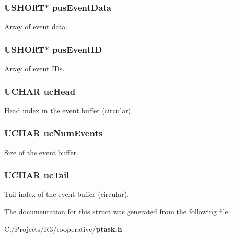 \subsubsection[{pusEventData}]{\setlength{\rightskip}{0pt plus 5cm}USHORT$\ast$ {\bf pusEventData}}\label{struct_p_t_a_s_k___e_v_e_n_t___s_t_r_u_c_t_a2dfcbf484220e9605cfba8d13114604e}


Array of event data. 
\subsubsection[{pusEventID}]{\setlength{\rightskip}{0pt plus 5cm}USHORT$\ast$ {\bf pusEventID}}\label{struct_p_t_a_s_k___e_v_e_n_t___s_t_r_u_c_t_ac01e1de90129401d0a7b2434e2b3e42f}


Array of event IDs. 
\subsubsection[{ucHead}]{\setlength{\rightskip}{0pt plus 5cm}UCHAR {\bf ucHead}}\label{struct_p_t_a_s_k___e_v_e_n_t___s_t_r_u_c_t_a4f91c0e37cafa6eaac87a3bc1b422dfc}


Head index in the event buffer (circular). 
\subsubsection[{ucNumEvents}]{\setlength{\rightskip}{0pt plus 5cm}UCHAR {\bf ucNumEvents}}\label{struct_p_t_a_s_k___e_v_e_n_t___s_t_r_u_c_t_ace9d2744b5bfe6fd35c7c0090542f9d7}


Size of the event buffer. 
\subsubsection[{ucTail}]{\setlength{\rightskip}{0pt plus 5cm}UCHAR {\bf ucTail}}\label{struct_p_t_a_s_k___e_v_e_n_t___s_t_r_u_c_t_a29134ca6534e7622ac06ccb07486ba07}


Tail index of the event buffer (circular). 

The documentation for this struct was generated from the following file:\begin{DoxyCompactItemize}
\item 
C:/Projects/R3/cooperative/{\bf ptask.h}\end{DoxyCompactItemize}
